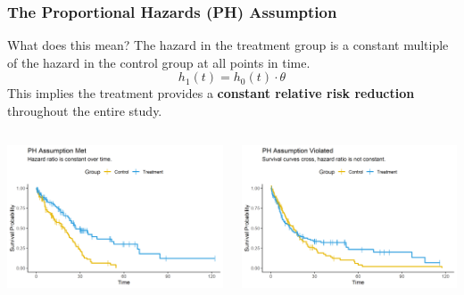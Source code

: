 \documentclass{beamer}
\begin{document}
\begin{frame}
\frametitle{The Proportional Hazards (PH) Assumption}
\begin{block}{What does this mean?}
The hazard in the treatment group is a constant multiple of the hazard in the control group at all points in time.
$$h_1(t) = h_0(t) \cdot \theta$$
This implies the treatment provides a \textbf{constant relative risk reduction} throughout the entire study.
\end{block}

\begin{columns}
\begin{column}{0.5\textwidth}
    \includegraphics[width=\textwidth]{images/ph_assumption_met.png}
\end{column}
\begin{column}{0.5\textwidth}
    \includegraphics[width=\textwidth]{images/ph_assumption_violated.png}
\end{column}
\end{columns}
\end{frame}
\end{document}
